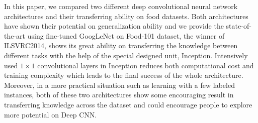 In this paper, we compared two different deep convolutional neural network architectures and their transferring ability on food datasets. Both architectures have shown their potential on generalization ability and we provide the state-of-the-art using fine-tuned GoogLeNet on Food-101 dataset, the winner of ILSVRC2014, shows its great ability on transferring the knowledge between different tasks with the help of the special designed unit, Inception. Intensively used $1\times 1$ convolutional layers in Inception reduces both computational cost and training complexity which leads to the final success of the whole architecture. Moreover, in a more practical situation such as learning with a few labeled instances, both of these two architectures show some encouraging result in transferring knowledge across the dataset and could encourage people to explore more potential on Deep CNN.